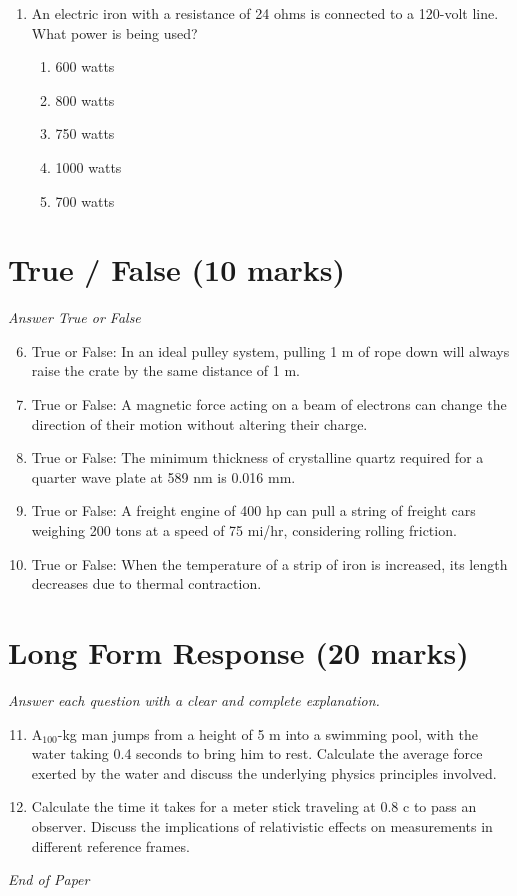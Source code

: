 \documentclass[12pt]{article}
\begin{document}
\begin{enumerate}[label=\arabic*.]
\begin{enumerate}[label=(\alph*)]
    \item reflection
    \item interference
\end{enumerate}
\item An electric iron with a resistance of 24 ohms is connected to a 120-volt line. What power is being used?
\begin{enumerate}[label=(\alph*)]
    \item 600 watts
    \item 800 watts
    \item 750 watts
    \item 1000 watts
    \item 700 watts
\end{enumerate}
\end{enumerate}

\section*{True / False (10 marks)}
\textit{Answer True or False}
\begin{enumerate}[label=\arabic*.]
\setcounter{enumi}{5}
\item True or False: In an ideal pulley system, pulling 1 m of rope down will always raise the crate by the same distance of 1 m.
\item True or False: A magnetic force acting on a beam of electrons can change the direction of their motion without altering their charge.
\item True or False: The minimum thickness of crystalline quartz required for a quarter wave plate at 589 nm is 0.016 mm.
\item True or False: A freight engine of 400 hp can pull a string of freight cars weighing 200 tons at a speed of 75 mi/hr, considering rolling friction.
\item True or False: When the temperature of a strip of iron is increased, its length decreases due to thermal contraction.
\end{enumerate}

\section*{Long Form Response (20 marks)}
\textit{Answer each question with a clear and complete explanation.}
\begin{enumerate}[label=\arabic*.]
\setcounter{enumi}{10}
\item A$_{100}$-kg man jumps from a height of 5 m into a swimming pool, with the water taking 0.4 seconds to bring him to rest. Calculate the average force exerted by the water and discuss the underlying physics principles involved.
\item Calculate the time it takes for a meter stick traveling at 0.8 c to pass an observer. Discuss the implications of relativistic effects on measurements in different reference frames.
\end{enumerate}

\vfill
\noindent\textit{End of Paper}
\end{document}
